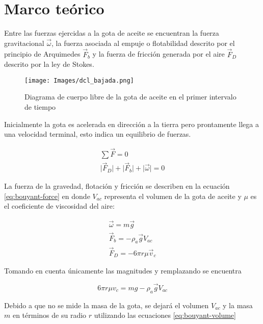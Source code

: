 \section{Marco teórico}

Entre las fuerzas ejercidas a la gota de aceite se encuentran la fuerza gravitacional $\Vec{\omega}$, la fuerza asociada al empuje o flotabilidad descrito por el principio de Arquimedes $\Vec{F}_b$ y la fuerza de fricción generada por el aire $\Vec{F}_D$ descrito por la ley de Stokes.\\

\begin{figure}
    \centering
    \texttt{[image: Images/dcl\_bajada.png]}
    \caption{Diagrama de cuerpo libre de la gota de aceite en el primer intervalo de tiempo}
    \label{fig:enter-label}
\end{figure}

Inicialmente la gota es acelerada en dirección a la tierra pero prontamente llega a una velocidad terminal, esto indica un equilibrio de fuerzas.

\begin{equation}
    \begin{split}
        \sum \Vec{F}=0\\
        \lvert \Vec{F}_D\rvert + \lvert\Vec{F}_b\rvert + \lvert \Vec{\omega}\rvert =0
    \end{split}
\end{equation}

La fuerza de la gravedad, flotación y fricción se describen en la ecuación \cref{eq:bouyant-force} en donde $V_{ac}$ representa el volumen de la gota de aceite y $\mu$ es el coeficiente de viscosidad del aire:

\begin{equation}\label{eq:forces}
    \begin{split}
        \Vec{\omega}=m\Vec{g}\\
        \Vec{F}_b=-\rho_a \Vec{g}V_{ac}\\
        \Vec{F}_D=-6\pi r\mu \Vec{v}_c
    \end{split}
\end{equation}

Tomando en cuenta únicamente las magnitudes y remplazando se encuentra

\begin{equation}
    6\pi r\mu v_c=mg-\rho_a \Vec{g}V_{ac}
\end{equation}

Debido a que no se mide la masa de la gota, se dejará el volumen $V_{ac}$ y la masa $m$ en términos de su radio $r$ utilizando las ecuaciones \cref{eq:bouyant-volume} 

